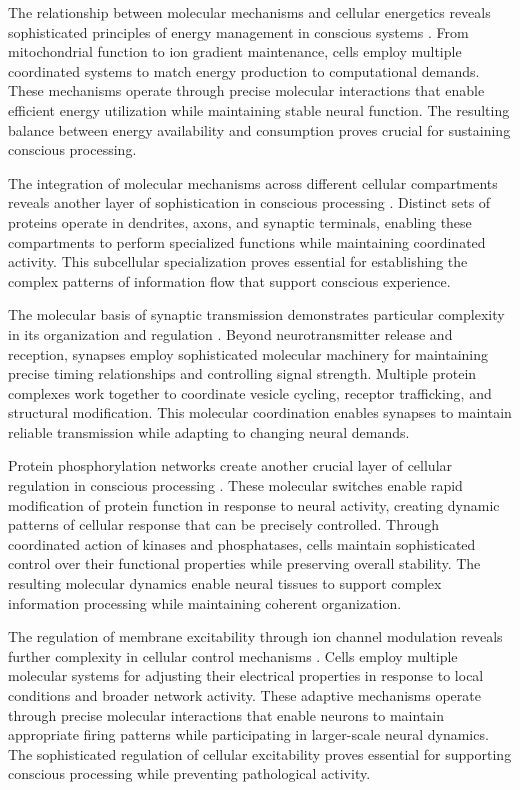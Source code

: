 The relationship between molecular mechanisms and cellular energetics reveals sophisticated principles of energy management in conscious systems \cite{Sengupta2014}. From mitochondrial function to ion gradient maintenance, cells employ multiple coordinated systems to match energy production to computational demands. These mechanisms operate through precise molecular interactions that enable efficient energy utilization while maintaining stable neural function. The resulting balance between energy availability and consumption proves crucial for sustaining conscious processing.

The integration of molecular mechanisms across different cellular compartments reveals another layer of sophistication in conscious processing \cite{Jonas2017}. Distinct sets of proteins operate in dendrites, axons, and synaptic terminals, enabling these compartments to perform specialized functions while maintaining coordinated activity. This subcellular specialization proves essential for establishing the complex patterns of information flow that support conscious experience.

The molecular basis of synaptic transmission demonstrates particular complexity in its organization and regulation \cite{Sudhof2018}. Beyond neurotransmitter release and reception, synapses employ sophisticated molecular machinery for maintaining precise timing relationships and controlling signal strength. Multiple protein complexes work together to coordinate vesicle cycling, receptor trafficking, and structural modification. This molecular coordination enables synapses to maintain reliable transmission while adapting to changing neural demands.

Protein phosphorylation networks create another crucial layer of cellular regulation in conscious processing \cite{Lane2018}. These molecular switches enable rapid modification of protein function in response to neural activity, creating dynamic patterns of cellular response that can be precisely controlled. Through coordinated action of kinases and phosphatases, cells maintain sophisticated control over their functional properties while preserving overall stability. The resulting molecular dynamics enable neural tissues to support complex information processing while maintaining coherent organization.

The regulation of membrane excitability through ion channel modulation reveals further complexity in cellular control mechanisms \cite{Marder2012}. Cells employ multiple molecular systems for adjusting their electrical properties in response to local conditions and broader network activity. These adaptive mechanisms operate through precise molecular interactions that enable neurons to maintain appropriate firing patterns while participating in larger-scale neural dynamics. The sophisticated regulation of cellular excitability proves essential for supporting conscious processing while preventing pathological activity.

